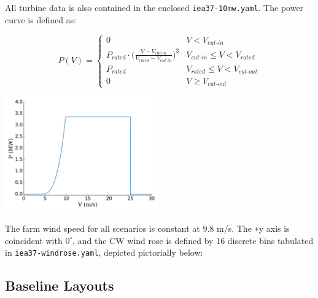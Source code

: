 \documentclass[10pt]{article}
\begin{document}
        \noindent All turbine data is also contained in the enclosed \texttt{iea37-10mw.yaml}. The power curve is defined as:   

        \begin{minipage}{0.53\textwidth}
            \begin{equation*}
                P(V) = 
                \begin{cases} 
                    0 & V < V_{\textit{cut-in}} \\
                    P_{\textit{rated}}\cdot\bigg(\frac{V-V_{\textit{cut-in}}}{V_{\textit{rated}}-V_{\textit{cut-in}}}\bigg)^3 & V_{\textit{cut-in}}\leq V < V_{\textit{rated}} \\
                    P_{\textit{rated}} & V_{\textit{rated}} \leq V < V_{\textit{cut-out}} \\
                    0 & V \geq V_{\textit{cut-out}}
                \end{cases}
            \label{eq:power}
            \end{equation*}
        \end{minipage}\quad
        \begin{minipage}{0.53\textwidth}
            \includegraphics[width=2.6in]{iea37-335mw-pcurve}
        \end{minipage}

        The farm wind speed for all scenarios is constant at 9.8 m/s. The \texttt{+}y axis is coincident with $0^{\circ}$, and the CW wind rose is defined by 16 discrete bins tabulated in \texttt{iea37-windrose.yaml}, depicted pictorially below:
        \begin{center}
        \end{center}
    \subsection{Baseline Layouts}
\end{document}
